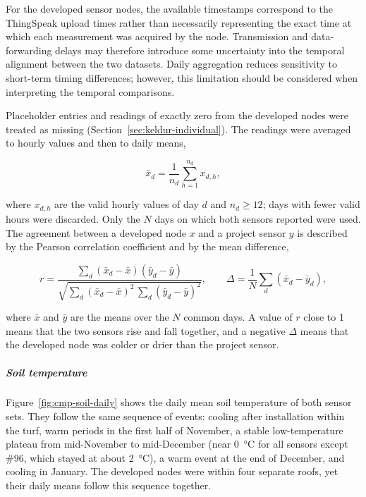 For the developed sensor nodes, the available timestamps correspond to the ThingSpeak upload times rather than necessarily representing the exact time at which each measurement was acquired by the node. Transmission and data-forwarding delays may therefore introduce some uncertainty into the temporal alignment between the two datasets. Daily aggregation reduces sensitivity to short-term timing differences; however, this limitation should be considered when interpreting the temporal comparisons.

Placeholder entries and readings of exactly zero from the developed nodes were treated as missing (Section~\ref{sec:keldur-individual}). The readings were averaged to hourly values and then to daily means,

\begin{equation}
\bar{x}_d = \frac{1}{n_d}\sum_{h=1}^{n_d} x_{d,h},
\label{eq:cmp-daily-mean}
\end{equation}

where $x_{d,h}$ are the valid hourly values of day $d$ and $n_d \geq 12$; days with fewer valid hours were discarded. Only the $N$ days on which both sensors reported were used. The agreement between a developed node $x$ and a project sensor $y$ is described by the Pearson correlation coefficient and by the mean difference,

\begin{equation}
r = \frac{\sum_{d}\left(\bar{x}_d-\bar{x}\right)\left(\bar{y}_d-\bar{y}\right)}{\sqrt{\sum_{d}\left(\bar{x}_d-\bar{x}\right)^{2}\,\sum_{d}\left(\bar{y}_d-\bar{y}\right)^{2}}},
\qquad
\Delta = \frac{1}{N}\sum_{d}\left(\bar{x}_d-\bar{y}_d\right),
\label{eq:cmp-agreement}
\end{equation}

where $\bar{x}$ and $\bar{y}$ are the means over the $N$ common days. A value of $r$ close to 1 means that the two sensors rise and fall together, and a negative $\Delta$ means that the developed node was colder or drier than the project sensor.

\subparagraph{Soil temperature}

Figure~\ref{fig:cmp-soil-daily} shows the daily mean soil temperature of both sensor sets. They follow the same sequence of events: cooling after installation within the turf, warm periods in the first half of November, a stable low-temperature plateau from mid-November to mid-December (near 0~°C for all sensors except \#96, which stayed at about 2~°C), a warm event at the end of December, and cooling in January. The developed nodes were within four separate roofs, yet their daily means follow this sequence together.

